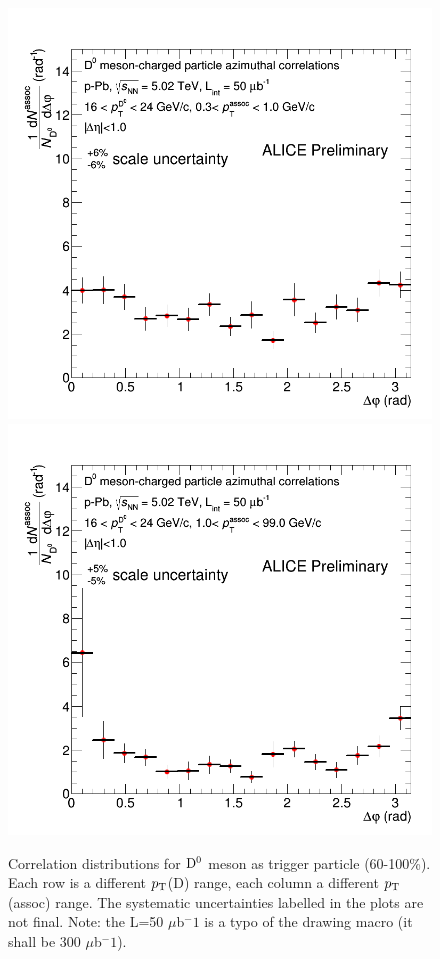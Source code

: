 \begin{figure}
{\includegraphics[width=0.32\linewidth]{figuresVsCent/Dzero/Correlations/60100/CanvaAndVariedHistopPbDzeroPt16to24assocPt03to1.png}}
{\includegraphics[width=0.32\linewidth]{figuresVsCent/Dzero/Correlations/60100/CanvaAndVariedHistopPbDzeroPt16to24assocPt1to99.png}}
 \caption{Correlation distributions for ${\rm D^0}$ meson as trigger particle (60-100\%). Each row is a different $p_{\rm T}$(D) range, each column a different $p_{\rm T}$(assoc) range. The systematic uncertainties labelled in the plots are not final. Note: the L=50 $\mu$b$^-1$ is a typo of the drawing macro (it shall be 300 $\mu$b$^-1$).}
\label{fig:Dzerocorr60100}
\end{figure}

